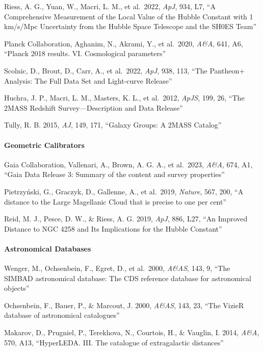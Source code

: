 \documentclass[
]{article}
\begin{document}
Riess, A. G., Yuan, W., Macri, L. M., et al.~2022, \emph{ApJ}, 934, L7,
``A Comprehensive Measurement of the Local Value of the Hubble Constant
with 1 km/s/Mpc Uncertainty from the Hubble Space Telescope and the
SH0ES Team''

Planck Collaboration, Aghanim, N., Akrami, Y., et al.~2020, \emph{A\&A},
641, A6, ``Planck 2018 results. VI. Cosmological parameters''

Scolnic, D., Brout, D., Carr, A., et al.~2022, \emph{ApJ}, 938, 113,
``The Pantheon+ Analysis: The Full Data Set and Light-curve Release''

Huchra, J. P., Macri, L. M., Masters, K. L., et al.~2012, \emph{ApJS},
199, 26, ``The 2MASS Redshift Survey---Description and Data Release''

Tully, R. B. 2015, \emph{AJ}, 149, 171, ``Galaxy Groups: A 2MASS
Catalog''

\paragraph{Geometric Calibrators}\label{geometric-calibrators}

Gaia Collaboration, Vallenari, A., Brown, A. G. A., et al.~2023,
\emph{A\&A}, 674, A1, ``Gaia Data Release 3: Summary of the content and
survey properties''

Pietrzyński, G., Graczyk, D., Gallenne, A., et al.~2019, \emph{Nature},
567, 200, ``A distance to the Large Magellanic Cloud that is precise to
one per cent''

Reid, M. J., Pesce, D. W., \& Riess, A. G. 2019, \emph{ApJ}, 886, L27,
``An Improved Distance to NGC 4258 and Its Implications for the Hubble
Constant''

\paragraph{Astronomical Databases}\label{astronomical-databases}

Wenger, M., Ochsenbein, F., Egret, D., et al.~2000, \emph{A\&AS}, 143,
9, ``The SIMBAD astronomical database: The CDS reference database for
astronomical objects''

Ochsenbein, F., Bauer, P., \& Marcout, J. 2000, \emph{A\&AS}, 143, 23,
``The VizieR database of astronomical catalogues''

Makarov, D., Prugniel, P., Terekhova, N., Courtois, H., \& Vauglin, I.
2014, \emph{A\&A}, 570, A13, ``HyperLEDA. III. The catalogue of
extragalactic distances''
\end{document}
